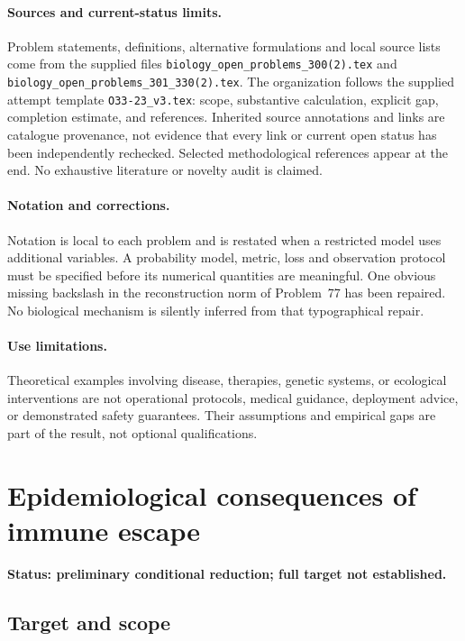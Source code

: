 \documentclass[11pt]{article}
\begin{document}
\paragraph{Sources and current-status limits.}
Problem statements, definitions, alternative formulations and local source lists
come from the supplied files
\texttt{biology\_open\_problems\_300(2).tex} and
\texttt{biology\_open\_problems\_301\_330(2).tex}.
The organization follows the supplied attempt template
\texttt{O33-23\_v3.tex}: scope, substantive calculation, explicit gap,
completion estimate, and references. Inherited source annotations and links are
catalogue provenance, not evidence that every link or current open status has
been independently rechecked. Selected methodological references appear at the
end. No exhaustive literature or novelty audit is claimed.

\paragraph{Notation and corrections.}
Notation is local to each problem and is restated when a restricted model uses
additional variables. A probability model, metric, loss and observation protocol
must be specified before its numerical quantities are meaningful. One obvious
missing backslash in the reconstruction norm of Problem~77 has been repaired.
No biological mechanism is silently inferred from that typographical repair.

\paragraph{Use limitations.}
Theoretical examples involving disease, therapies, genetic systems, or ecological
interventions are not operational protocols, medical guidance, deployment advice,
or demonstrated safety guarantees. Their assumptions and empirical gaps are part
of the result, not optional qualifications.


\section*{Epidemiological consequences of immune escape}
\label{prob:208}
\noindent\textbf{Status: preliminary conditional reduction; full target not established.}
\subsection{Target and scope}
\end{document}
